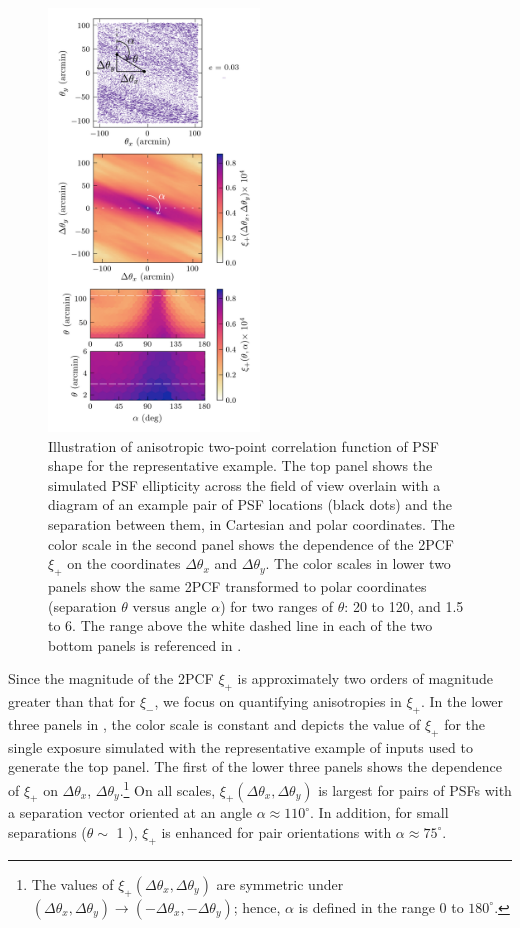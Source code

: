 \documentclass[twocolumn]{aastex631}
\begin{document}
\begin{figure}
\includegraphics[width=0.5\textwidth]{f6_2d2pcf_example_decorated.png}
    \caption{Illustration of anisotropic two-point correlation function of PSF shape for the \psfwssims representative example. 
  The top panel shows the simulated PSF ellipticity across the field of view overlain with a diagram of an example pair of PSF locations (black dots) and the separation between them, in Cartesian and polar coordinates.
  The color scale in the second panel shows the dependence of the 2PCF $\xi_+$ on the coordinates $\Delta \theta_x$ and $\Delta \theta_y$.
  The color scales in lower two panels show the same 2PCF transformed to polar coordinates (separation $\theta$ versus angle $\alpha$)  for two ranges of $\theta$: 20 to 120\amin, and 1.5 to 6\amin. 
  The range above the white dashed line in each of the two bottom panels is referenced in .
    \label{fig:anisoexample}
    }
\end{figure}

Since the magnitude of the 2PCF $\xi_+$ is approximately two orders of magnitude greater than that for $\xi_-$, we focus on quantifying anisotropies in $\xi_+$.
In the lower three panels in , the color scale is constant and depicts the value of $\xi_+$ for the single exposure simulated with the representative example of \psfws inputs used to generate the top panel.
The first of the lower three panels shows the dependence of $\xi_+$ on $\Delta\theta_x$, $\Delta\theta_y$.\footnote{The values of $\xi_+(\Delta\theta_x, \Delta\theta_y)$ are symmetric under $(\Delta\theta_x, \Delta\theta_y) \rightarrow (-\Delta\theta_x, -\Delta\theta_y)$; hence, $\alpha$ is defined in the range 0 to $180^\circ$.}   
On all scales, $\xi_+(\Delta\theta_x, \Delta\theta_y)$ is largest for pairs of PSFs  with a separation vector oriented at an angle $\alpha \approx 110^\circ$. 
In addition, for small separations ($\theta \sim$ 1 \amin), $\xi_+$ is enhanced for pair orientations with $\alpha \approx 75^\circ$. 
\end{document}
